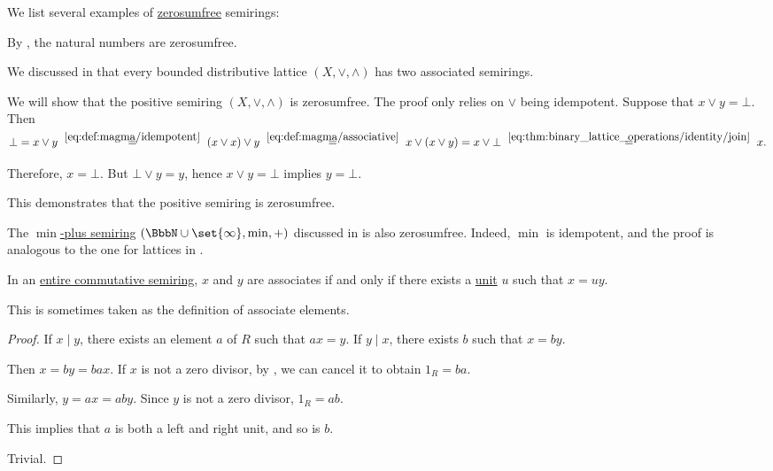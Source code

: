 \begin{example}\label{ex:def:zerosumfree}
  We list several examples of \hyperref[def:zerosumfree]{zerosumfree} semirings:
  \begin{thmenum}
     By , the natural numbers are zerosumfree.

     We discussed in  that every bounded distributive lattice \( (X, \vee, \wedge) \) has two associated semirings.

    We will show that the positive semiring \( (X, \vee, \wedge) \) is zerosumfree. The proof only relies on \( \vee \) being idempotent. Suppose that \( x \vee y = \bot \). Then
    \begin{equation*}
      \bot
      =
      x \vee y
      \reloset {\eqref{eq:def:magma/idempotent}} =
      (x \vee x) \vee y
      \reloset {\eqref{eq:def:magma/associative}} =
      x \vee (x \vee y)
      =
      x \vee \bot
      \reloset {\eqref{eq:thm:binary_lattice_operations/identity/join}} =
      x.
    \end{equation*}

    Therefore, \( x = \bot \). But \( \bot \vee y = y \), hence \( x \vee y = \bot \) implies \( y = \bot \).

    This demonstrates that the positive semiring is zerosumfree.

     The \hyperref[def:tropical_semiring]{\( \min \)-plus semiring} \( (\BbbN \cup \set{ \infty }, \min, +) \) discussed in  is also zerosumfree. Indeed, \( \min \) is idempotent, and the proof is analogous to the one for lattices in .
  \end{thmenum}
\end{example}

\begin{proposition}\label{thm:associates_in_entire_semirings}
  In an \hyperref[def:divisibility/zero]{entire commutative semiring}, \( x \) and \( y \) are associates if and only if there exists a \hyperref[def:divisibility/zero]{unit} \( u \) such that \( x = uy \).

  This is sometimes taken as the definition of associate elements.
\end{proposition}
\begin{proof}
  \NecessitySubProof If \( x \mid y \), there exists an element \( a \) of \( R \) such that \( ax = y \). If \( y \mid x \), there exists \( b \) such that \( x = by \).

  Then \( x = by = bax \). If \( x \) is not a zero divisor, by , we can cancel it to obtain \( 1_R = ba \).

  Similarly, \( y = ax = aby \). Since \( y \) is not a zero divisor, \( 1_R = ab \).

  This implies that \( a \) is both a left and right unit, and so is \( b \).

  \SufficiencySubProof Trivial.
\end{proof}


